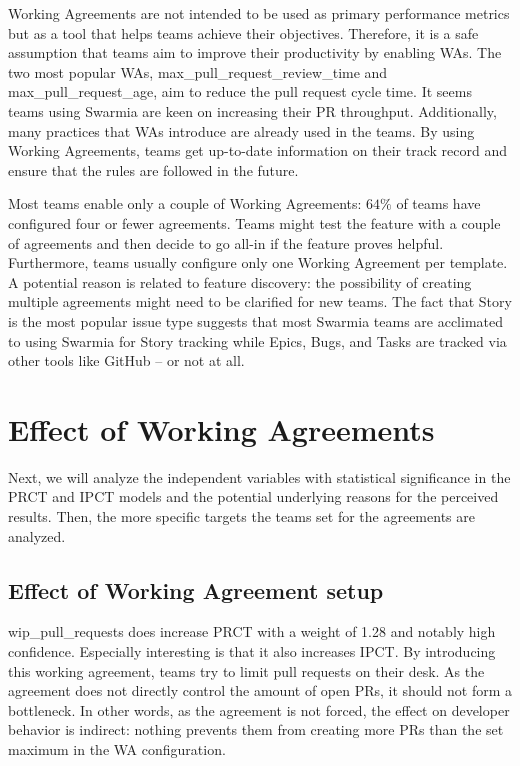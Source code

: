 Working Agreements are not intended to be used as primary performance metrics but as a tool that helps teams achieve their objectives. Therefore, it is a safe assumption that teams aim to improve their productivity by enabling WAs. The two most popular WAs, max\_pull\_request\_review\_time and max\_pull\_request\_age, aim to reduce the pull request cycle time. It seems teams using Swarmia are keen on increasing their PR throughput. Additionally, many practices that WAs introduce are already used in the teams. By using Working Agreements, teams get up-to-date information on their track record and ensure that the rules are followed in the future. 

Most teams enable only a couple of Working Agreements: $64\%$ of teams have configured four or fewer agreements. Teams might test the feature with a couple of agreements and then decide to go all-in if the feature proves helpful. Furthermore, teams usually configure only one Working Agreement per template. A potential reason is related to feature discovery: the possibility of creating multiple agreements might need to be clarified for new teams. The fact that Story is the most popular issue type suggests that most Swarmia teams are acclimated to using Swarmia for Story tracking while Epics, Bugs, and Tasks are tracked via other tools like GitHub – or not at all.

\section{Effect of Working Agreements}


Next, we will analyze the independent variables with statistical significance in the PRCT and IPCT models and the potential underlying reasons for the perceived results. Then, the more specific targets the teams set for the agreements are analyzed.

\subsection{Effect of Working Agreement setup}

wip\_pull\_requests does increase PRCT with a weight of 1.28 and notably high confidence. Especially interesting is that it also increases IPCT. By introducing this working agreement, teams try to limit pull requests on their desk. As the agreement does not directly control the amount of open PRs, it should not form a bottleneck. In other words, as the agreement is not forced, the effect on developer behavior is indirect: nothing prevents them from creating more PRs than the set maximum in the WA configuration. 

